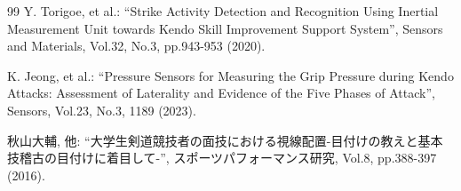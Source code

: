 \documentclass{ujarticle}
\begin{document}




\begin{thebibliography}{99}%
 Y. Torigoe, et al.: ``Strike Activity Detection and Recognition Using Inertial Measurement Unit towards Kendo Skill Improvement Support System'', Sensors and Materials, Vol.32, No.3, pp.943-953 (2020).

 K. Jeong, et al.: ``Pressure Sensors for Measuring the Grip Pressure during Kendo Attacks: Assessment of Laterality and Evidence of the Five Phases of Attack'', Sensors, Vol.23, No.3, 1189 (2023).

 秋山大輔, 他: ``大学生剣道競技者の面技における視線配置-目付けの教えと基本技稽古の目付けに着目して-'', スポーツパフォーマンス研究, Vol.8, pp.388-397 (2016).

\end{thebibliography}
\end{document}
